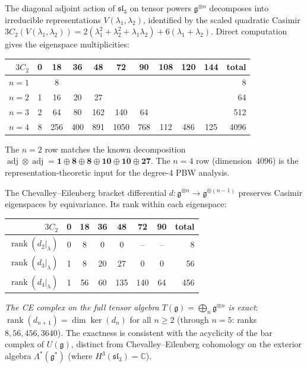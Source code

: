 \begin{computation}
\label{comp:sl3-casimir-decomp}

The diagonal adjoint action of $\mathfrak{sl}_3$ on tensor powers
$\mathfrak{g}^{\otimes n}$ decomposes into irreducible representations
$V(\lambda_1, \lambda_2)$, identified by the scaled quadratic Casimir
$3C_2(V(\lambda_1,\lambda_2)) = 2(\lambda_1^2 + \lambda_2^2 + \lambda_1\lambda_2) + 6(\lambda_1 + \lambda_2)$.
Direct computation
gives the eigenspace multiplicities:
\begin{center}
\begin{tabular}{r|ccccccccc|r}
$3C_2$ & 0 & 18 & 36 & 48 & 72 & 90 & 108 & 120 & 144 & total \\
\hline
$n=1$ & & 8 & & & & & & & & 8 \\
$n=2$ & 1 & 16 & 20 & 27 & & & & & & 64 \\
$n=3$ & 2 & 64 & 80 & 162 & 140 & 64 & & & & 512 \\
$n=4$ & 8 & 256 & 400 & 891 & 1050 & 768 & 112 & 486 & 125 & 4096
\end{tabular}
\end{center}
The $n=2$ row matches the known decomposition
$\operatorname{adj} \otimes \operatorname{adj}
= \mathbf{1} \oplus \mathbf{8} \oplus \mathbf{8}
\oplus \mathbf{10} \oplus \overline{\mathbf{10}} \oplus \mathbf{27}$.
The $n=4$ row (dimension~$4096$) is the representation-theoretic
input for the degree-$4$ PBW analysis.

The Chevalley--Eilenberg bracket differential
$d\colon \mathfrak{g}^{\otimes n} \to \mathfrak{g}^{\otimes (n-1)}$
preserves Casimir eigenspaces by equivariance. Its rank within each eigenspace:
\begin{center}
\begin{tabular}{r|cccccc|r}
$3C_2$ & 0 & 18 & 36 & 48 & 72 & 90 & total \\
\hline
$\operatorname{rank}(d_2|_\lambda)$ & 0 & 8 & 0 & 0 & -- & -- & 8 \\
$\operatorname{rank}(d_3|_\lambda)$ & 1 & 8 & 20 & 27 & 0 & 0 & 56 \\
$\operatorname{rank}(d_4|_\lambda)$ & 1 & 56 & 60 & 135 & 140 & 64 & 456 \\
\end{tabular}
\end{center}
\emph{The CE complex on the full tensor algebra
$T(\mathfrak{g}) = \bigoplus_n \mathfrak{g}^{\otimes n}$ is exact}:
$\operatorname{rank}(d_{n+1}) = \dim \ker(d_n)$ for all $n \geq 2$
(through $n = 5$: ranks $8, 56, 456, 3640$).
The exactness is consistent with the acyclicity of the bar complex of $U(\mathfrak{g})$,
distinct from Chevalley--Eilenberg cohomology on the exterior algebra
$\Lambda^*(\mathfrak{g}^*)$ (where $H^3(\mathfrak{sl}_3) = \mathbb{C}$).


\end{computation}
